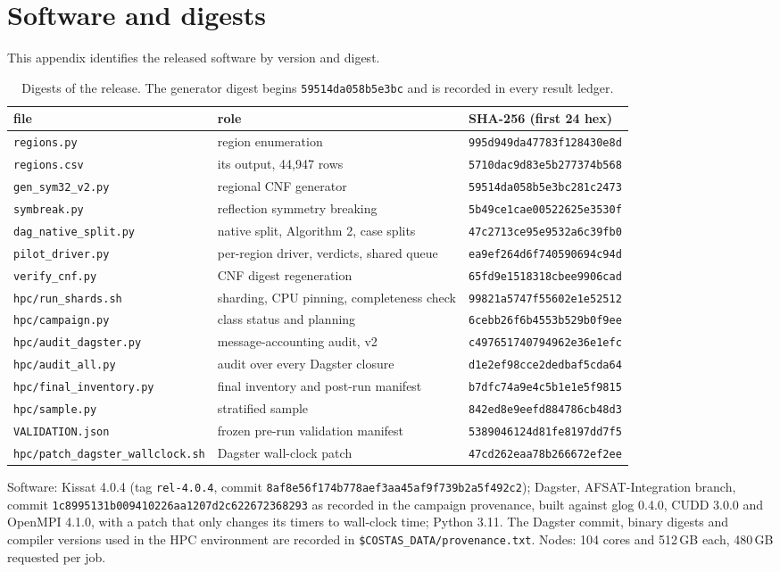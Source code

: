 \documentclass[11pt,a4paper]{article}
\theoremstyle{definition}
\newcommand{\code}[1]{\texttt{#1}}
\begin{document}
\section{Software and digests}\label{app:digests}
This appendix identifies the released software by version and digest.

\begin{table}[H]\centering\footnotesize
\begin{tabular}{@{}l p{5.6cm} l@{}}
\toprule
file & role & SHA-256 (first 24 hex) \\
\midrule
\code{regions.py} & region enumeration & \code{995d949da47783f128430e8d} \\
\code{regions.csv} & its output, 44,947 rows & \code{5710dac9d83e5b277374b568} \\
\code{gen\_sym32\_v2.py} & regional CNF generator & \code{59514da058b5e3bc281c2473} \\
\code{symbreak.py} & reflection symmetry breaking & \code{5b49ce1cae00522625e3530f} \\
\code{dag\_native\_split.py} & native split, Algorithm 2, case splits & \code{47c2713ce95e9532a6c39fb0} \\
\code{pilot\_driver.py} & per-region driver, verdicts, shared queue & \code{ea9ef264d6f740590694c94d} \\
\code{verify\_cnf.py} & CNF digest regeneration & \code{65fd9e1518318cbee9906cad} \\
\code{hpc/run\_shards.sh} & sharding, CPU pinning, completeness check & \code{99821a5747f55602e1e52512} \\
\code{hpc/campaign.py} & class status and planning & \code{6cebb26f6b4553b529b0f9ee} \\
\code{hpc/audit\_dagster.py} & message-accounting audit, v2 & \code{c497651740794962e36e1efc} \\
\code{hpc/audit\_all.py} & audit over every Dagster closure & \code{d1e2ef98cce2dedbaf5cda64} \\
\code{hpc/final\_inventory.py} & final inventory and post-run manifest & \code{b7dfc74a9e4c5b1e1e5f9815} \\
\code{hpc/sample.py} & stratified sample & \code{842ed8e9eefd884786cb48d3} \\
\code{VALIDATION.json} & frozen pre-run validation manifest & \code{5389046124d81fe8197dd7f5} \\
\code{hpc/patch\_dagster\_wallclock.sh} & Dagster wall-clock patch & \code{47cd262eaa78b266672ef2ee} \\
\bottomrule
\end{tabular}
\caption{Digests of the release. The generator digest begins \code{59514da058b5e3bc} and is
recorded in every result ledger.}
\end{table}
\noindent Software: Kissat 4.0.4 (tag \code{rel-4.0.4}, commit
\code{8af8e56f174b778aef3aa45af9f739b2a5f492c2}); Dagster, AFSAT-Integration branch, commit
\code{1c8995131b009410226aa1207d2c622672368293} as recorded in the campaign provenance, built
against glog 0.4.0, CUDD 3.0.0 and OpenMPI 4.1.0, with a patch that only changes its timers to
wall-clock time; Python 3.11. The Dagster commit, binary digests and compiler versions used in the HPC environment are recorded in \code{\$COSTAS\_DATA/provenance.txt}. Nodes: 104 cores and 512\,GB each, 480\,GB requested
per job.
\end{document}
